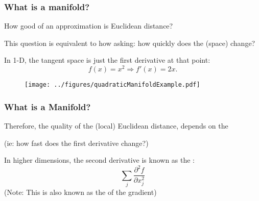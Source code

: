 \documentclass{beamer}
\begin{document}
%
%

%

\begin{frame}[fragile]
\frametitle{What is a manifold?}
How good of an approximation is Euclidean distance? 
\vsp

This question is equivalent to how asking: how quickly does the  (space) change?  

\vsp
In 1-D, the tangent space is just the first derivative at that point: 
\[
f(x) = x^2 \Rightarrow f'(x) = 2x.
\]
\begin{figure}
\centering
\texttt{[image: ../figures/quadraticManifoldExample.pdf]}
\end{figure}

\end{frame}

\begin{frame}[fragile]
\frametitle{What is a Manifold?}
Therefore, the quality of the (local) Euclidean distance, depends on the  

{\scriptsize (ie: how fast does the first derivative change?) }

\vsp
In higher dimensions, the second
derivative is known as the :
\[
\sum_{j} \frac{\partial^2 f}{\partial x_j^2}
\]
{\scriptsize (Note: This is also known as the  of the gradient)}

\end{frame}
\end{document}
